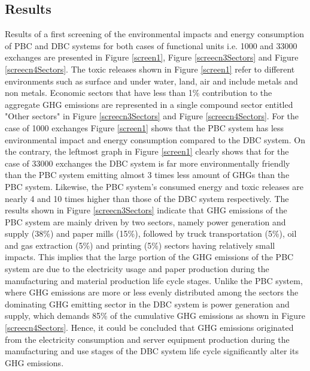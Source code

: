\documentclass[3p,times,procedia]{elsarticle}
\begin{document}
\subsection{Results}
Results of a first screening of the environmental impacts and energy consumption of PBC and DBC systems for both cases of functional units i.e. 1000 and 33000 exchanges are presented in Figure \ref{screen1}, Figure \ref{screecn3Sectors} and Figure \ref{screecn4Sectors}. The toxic releases shown in Figure \ref{screen1} refer to different environments such as surface and under water, land, air and include metals and non metals. Economic sectors that have less than 1\% contribution to the aggregate GHG emissions are represented in a single compound sector entitled "Other sectors" in Figure \ref{screecn3Sectors} and Figure \ref{screecn4Sectors}. For the case of 1000 exchanges Figure \ref{screen1} shows that the PBC system has less environmental impact and energy consumption compared to the DBC system. On the contrary, the leftmost graph in Figure \ref{screen1} clearly shows that for the case of 33000 exchanges the DBC system is far more environmentally friendly than the PBC system emitting almost 3 times less amount of GHGs than the PBC system. Likewise, the PBC system's consumed energy and toxic releases are nearly 4 and 10 times higher than those of the DBC system respectively. The results shown in Figure \ref{screecn3Sectors} indicate that GHG emissions of the PBC system are mainly driven by two sectors, namely power generation and supply (38\%) and paper mills (15\%), followed by truck transportation (5\%), oil and gas extraction (5\%) and printing (5\%) sectors having relatively small impacts. This implies that the large portion of the GHG emissions of the PBC system are due to the electricity usage and paper production during the manufacturing and material production life cycle stages. Unlike the PBC system, where GHG emissions are more or less evenly distributed among the sectors the dominating GHG emitting sector in the DBC system is power generation and supply, which demands 85\% of the cumulative GHG emissions as shown in Figure \ref{screecn4Sectors}. Hence, it could be concluded that GHG emissions originated from the electricity consumption and server equipment production during the manufacturing and use stages of the DBC system life cycle significantly alter its GHG emissions. 
\end{document}
